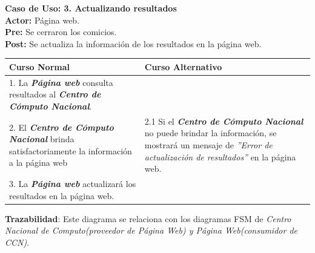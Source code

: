 \documentclass[spanish, 10pt,a4paper]{article}
\numberwithin{equation}{section} %
\begin{document}
\noindent\textbf{Caso de Uso: 3. Actualizando resultados}\\
\textbf{Actor: } Página web.\\
\textbf{Pre: } Se cerraron los comicios.\\
\textbf{Post: } Se actualiza la información de los resultados en la página web.\\
\begin{table}[H]
  \centering
  \begin{tabular}{p{9cm} | p{7cm}}
    \hline
    Curso Normal & Curso Alternativo \\
    \hline
    \hline    
    1. La \textbf{\textit{Página web}} consulta resultados al \textbf{\textit{Centro de Cómputo Nacional}}. 
    & \\
    
    \hline
    2. El \textbf{\textit{Centro de Cómputo Nacional}} brinda satisfactoriamente la información a la página web
    & 
    2.1 Si el \textbf{\textit{Centro de Cómputo Nacional}} no puede brindar la información, se mostrará un mensaje de \textit{''Error de actualización de resultados''} en la página web.
    \\
    
    \hline
    3. La \textbf{\textit{Página web}} actualizará los resultados en la página web.
    & \\
    \hline
  \end{tabular}
\end{table}
\vspace{-10px}
\noindent\textbf{Trazabilidad}: Este diagrama se relaciona con los diagramas FSM de \textit{Centro Nacional de Computo(proveedor de Página Web) y Página Web(consumidor de CCN)}.\\
\end{document}
